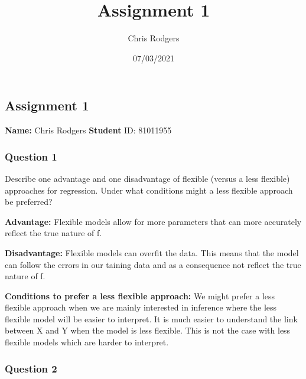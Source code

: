 \documentclass[
]{article}
\title{Assignment 1}
\author{Chris Rodgers}
\date{07/03/2021}
\newenvironment{Shaded}{\begin{snugshade}}{\end{snugshade}}
\newcommand{\AttributeTok}[1]{\textcolor[rgb]{0.77,0.63,0.00}{#1}}
\newcommand{\ConstantTok}[1]{\textcolor[rgb]{0.00,0.00,0.00}{#1}}
\newcommand{\FunctionTok}[1]{\textcolor[rgb]{0.00,0.00,0.00}{#1}}
\newcommand{\NormalTok}[1]{#1}
\newcommand{\SpecialCharTok}[1]{\textcolor[rgb]{0.00,0.00,0.00}{#1}}
\newcommand{\StringTok}[1]{\textcolor[rgb]{0.31,0.60,0.02}{#1}}
\begin{document}
\maketitle

\begin{Shaded}
\end{Shaded}

\hypertarget{assignment-1}{%
\subsection{Assignment 1}\label{assignment-1}}

\textbf{Name:} Chris Rodgers \textbf{Student} ID: 81011955

\hypertarget{question-1}{%
\subsubsection{Question 1}\label{question-1}}

Describe one advantage and one disadvantage of flexible (versus a less
flexible) approaches for regression. Under what conditions might a less
flexible approach be preferred?

\textbf{Advantage:} Flexible models allow for more parameters that can
more accurately reflect the true nature of f.

\textbf{Disadvantage:} Flexible models can overfit the data. This means
that the model can follow the errors in our taining data and as a
consequence not reflect the true nature of f.

\textbf{Conditions to prefer a less flexible approach:} We might prefer
a less flexible approach when we are mainly interested in inference
where the less flexible model will be easier to interpret. It is much
easier to understand the link between X and Y when the model is less
flexible. This is not the case with less flexible models which are
harder to interpret.

\hypertarget{question-2}{%
\subsubsection{Question 2}\label{question-2}}
\end{document}
